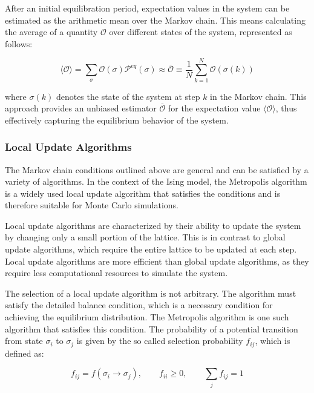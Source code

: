 After an initial equilibration period, expectation values in the system can be
estimated as the arithmetic mean over the Markov chain. This means calculating
the average of a quantity \( \mathcal{O} \) over different states of the system,
represented as follows:

\begin{equation}
    \langle \mathcal{O} \rangle = \sum_{\sigma}\mathcal{O}(\sigma)\mathcal{P}^{eq}(\sigma) \approx \overline{\mathcal{O}} \equiv \frac{1}{N} \sum_{k=1}^{N}\mathcal{O}(\sigma(k))
\end{equation}

where \( \sigma(k) \) denotes the state of the system at step \( k \) in the
Markov chain. This approach provides an unbiased estimator
$\overline{\mathcal{O}} $ for the expectation value \( \langle \mathcal{O}
\rangle \), thus effectively capturing the equilibrium behavior of the system.

\subsubsection{Local Update Algorithms}

The Markov chain conditions outlined above are general and can be satisfied by a
variety of algorithms. In the context of the Ising model, the Metropolis
algorithm is a widely used local update algorithm that satisfies the conditions
and is therefore suitable for Monte Carlo simulations.

Local update algorithms are characterized by their ability to update the system
by changing only a small portion of the lattice. This is in contrast to global
update algorithms, which require the entire lattice to be updated at each step.
Local update algorithms are more efficient than global update algorithms, as
they require less computational resources to simulate the system.

The selection of a local update algorithm is not arbitrary. The algorithm must
satisfy the detailed balance condition, which is a necessary condition for
achieving the equilibrium distribution. The Metropolis algorithm is one such
algorithm that satisfies this condition. The probability of a potential
transition from state \( \sigma_i \) to \( \sigma_j \) is given by the so called
selection probability \( f_{ij} \), which is defined as:

\begin{equation}
    f_{ij} = f(\sigma_i \rightarrow \sigma_j), \qquad f_{ii} \geq 0, \qquad \sum_j f_{ij} = 1
\end{equation}

